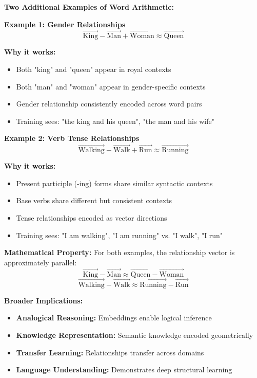 \documentclass[12pt]{article}
\begin{document}
\begin{enumerate}[(a)]
{    \textbf{Two Additional Examples of Word Arithmetic:}
    
    \textbf{Example 1: Gender Relationships}
    $$\vec{\text{King}} - \vec{\text{Man}} + \vec{\text{Woman}} \approx \vec{\text{Queen}}$$
    
    \textbf{Why it works:}
    \begin{itemize}
        \item Both "king" and "queen" appear in royal contexts
        \item Both "man" and "woman" appear in gender-specific contexts
        \item Gender relationship consistently encoded across word pairs
        \item Training sees: "the king and his queen", "the man and his wife"
    \end{itemize}
    
    \textbf{Example 2: Verb Tense Relationships}
    $$\vec{\text{Walking}} - \vec{\text{Walk}} + \vec{\text{Run}} \approx \vec{\text{Running}}$$
    
    \textbf{Why it works:}
    \begin{itemize}
        \item Present participle (-ing) forms share similar syntactic contexts
        \item Base verbs share different but consistent contexts
        \item Tense relationships encoded as vector directions
        \item Training sees: "I am walking", "I am running" vs. "I walk", "I run"
    \end{itemize}
    
    \textbf{Mathematical Property:}
    For both examples, the relationship vector is approximately parallel:
    $$\vec{\text{King}} - \vec{\text{Man}} \approx \vec{\text{Queen}} - \vec{\text{Woman}}$$
    $$\vec{\text{Walking}} - \vec{\text{Walk}} \approx \vec{\text{Running}} - \vec{\text{Run}}$$
    
    \textbf{Broader Implications:}
    \begin{itemize}
        \item \textbf{Analogical Reasoning:} Embeddings enable logical inference
        \item \textbf{Knowledge Representation:} Semantic knowledge encoded geometrically
        \item \textbf{Transfer Learning:} Relationships transfer across domains
        \item \textbf{Language Understanding:} Demonstrates deep structural learning
    \end{itemize}
    
}
\end{enumerate}
\end{document}
